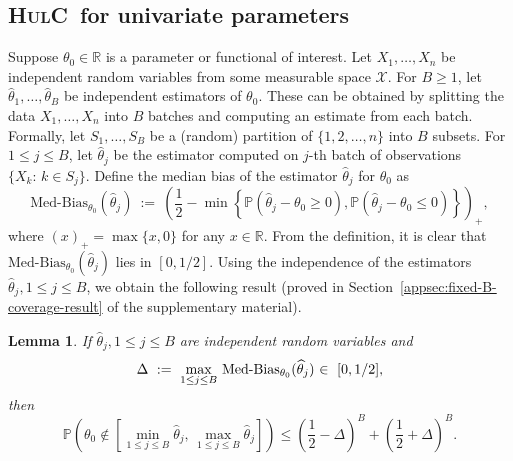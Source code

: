 \documentclass{article}
\newcommand{\hulc}{\textsc{HulC}~}
\newtheorem{lem}{Lemma}
\numberwithin{myalgctr}{section}
\begin{document}
\begin{enumerate}
\end{enumerate}


\subsection{\hulc for univariate parameters}
Suppose $\theta_0\in\mathbb{R}$ is a parameter or functional of interest. Let $X_1, \ldots, X_n$ be independent random variables from some measurable space $\mathcal{X}$. For $B\ge1$, let $\widehat{\theta}_1, \ldots, \widehat{\theta}_B$ be independent estimators of $\theta_0$. These can be obtained by splitting the data $X_1, \ldots, X_n$ into $B$ batches and computing an estimate from each batch.
{\color{black}Formally, let $S_1, \ldots, S_B$ be a (random) partition of $\{1, 2, \ldots, n\}$ into $B$ subsets. For $1\le j\le B$, let $\widehat{\theta}_j$ be the estimator computed on $j$-th batch of observations $\{X_k:\, k\in S_j\}$.}
Define the median bias of the estimator $\widehat{\theta}_j$ for $\theta_0$ as
\begin{equation}\label{definition:median-bias}
\mbox{Med-Bias}_{\theta_0}(\widehat{\theta}_j) ~:=~ \left(\frac{1}{2} - \min\left\{\mathbb{P}(\widehat{\theta}_j - \theta_0 \ge 0), \mathbb{P}(\widehat{\theta}_j - \theta_0 \le 0)\right\}\right)_+,
\end{equation}
where $(x)_+ = \max\{x, 0\}$ for any $x\in\mathbb{R}$. {\color{black}From the definition, it is clear that $\mbox{Med-Bias}_{\theta_0}(\widehat{\theta}_j)$ lies in $[0, 1/2]$.}
Using the independence of the estimators $\widehat{\theta}_j, 1\le j\le B$, we obtain the following result (proved in Section~\ref{appsec:fixed-B-coverage-result} of the supplementary material). 
\begin{lem}\label{lem:fixed-B-coverage-result}
If $\widehat{\theta}_j, 1\le j\le B$ are independent random variables and
\begin{equation}\label{eq:delta-definition-main-lemma}
\Delta ~:=~ \max_{1\le j\le B}\,\mathrm{Med\mbox{-}Bias}_{\theta_0}(\widehat{\theta}_j){\color{black}~\in~[0, 1/2]},
\end{equation}
then
\[
\mathbb{P}\left(\theta_0 \notin \left[\min_{1\le j\le B}\widehat{\theta}_j,\,\max_{1\le j\le B}\widehat{\theta}_j\right]\right) \le \left(\frac{1}{2} - \Delta\right)^B + \left(\frac{1}{2} + \Delta\right)^B.
\]
\end{lem}
\end{document}
